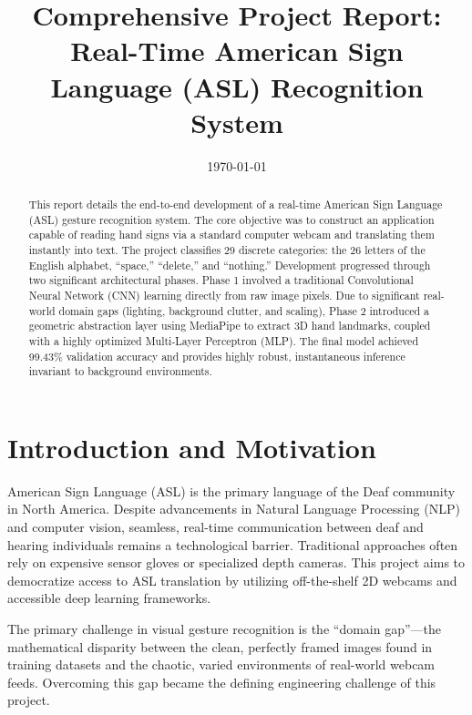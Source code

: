\documentclass[12pt,a4paper]{article}
\title{\textbf{Comprehensive Project Report:\\Real-Time American Sign Language (ASL) Recognition System}}
\author{}
\date{\today}
\begin{document}
\maketitle

\begin{abstract}
This report details the end-to-end development of a real-time American Sign Language (ASL) gesture recognition system. The core objective was to construct an application capable of reading hand signs via a standard computer webcam and translating them instantly into text. The project classifies 29 discrete categories: the 26 letters of the English alphabet, ``space,'' ``delete,'' and ``nothing.'' Development progressed through two significant architectural phases. Phase 1 involved a traditional Convolutional Neural Network (CNN) learning directly from raw image pixels. Due to significant real-world domain gaps (lighting, background clutter, and scaling), Phase 2 introduced a geometric abstraction layer using MediaPipe to extract 3D hand landmarks, coupled with a highly optimized Multi-Layer Perceptron (MLP). The final model achieved 99.43\% validation accuracy and provides highly robust, instantaneous inference invariant to background environments.
\end{abstract}

\section{Introduction and Motivation}
American Sign Language (ASL) is the primary language of the Deaf community in North America. Despite advancements in Natural Language Processing (NLP) and computer vision, seamless, real-time communication between deaf and hearing individuals remains a technological barrier. Traditional approaches often rely on expensive sensor gloves or specialized depth cameras. This project aims to democratize access to ASL translation by utilizing off-the-shelf 2D webcams and accessible deep learning frameworks. 

The primary challenge in visual gesture recognition is the ``domain gap''---the mathematical disparity between the clean, perfectly framed images found in training datasets and the chaotic, varied environments of real-world webcam feeds. Overcoming this gap became the defining engineering challenge of this project.
\end{document}

